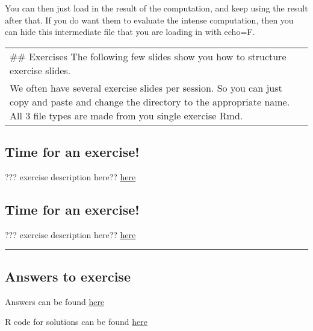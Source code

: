 \documentclass[
]{article}
\begin{document}
You can then just load in the result of the computation, and keep using
the result after that. If you do want them to evaluate the intense
computation, then you can hide this intermediate file that you are
loading in with echo=F.

\begin{longtable}[]{@{}l@{}}
\toprule
\endhead
\begin{minipage}[t]{0.04\columnwidth}\raggedright
\#\# Exercises The following few slides show you how to structure
exercise slides.\strut
\end{minipage}\tabularnewline
\begin{minipage}[t]{0.04\columnwidth}\raggedright
We often have several exercise slides per session. So you can just copy
and paste and change the directory to the appropriate name. All 3 file
types are made from you single exercise Rmd.\strut
\end{minipage}\tabularnewline
\bottomrule
\end{longtable}

\hypertarget{time-for-an-exercise}{%
\subsection{Time for an exercise!}\label{time-for-an-exercise}}

??? exercise description here??
\href{../../exercises/exercises/MyExercise1_exercises.html}{here}

\hypertarget{time-for-an-exercise-1}{%
\subsection{Time for an exercise!}\label{time-for-an-exercise-1}}

??? exercise description here??
\href{../../exercises/exercises/MyExercise2_exercises.html}{here}

\begin{center}\rule{0.5\linewidth}{0.5pt}\end{center}

\hypertarget{answers-to-exercise}{%
\subsection{Answers to exercise}\label{answers-to-exercise}}

Answers can be found
\href{../../exercises/answers/MyExercise2_answers.html}{here}

R code for solutions can be found
\href{../../exercises/answers/MyExercise2_answers.R}{here}
\end{document}
